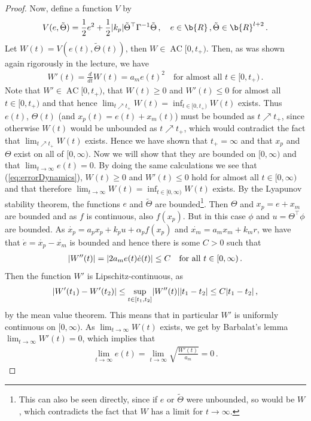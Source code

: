 \documentclass[12pt,a4paper]{article}
\DeclarePairedDelimiter{\abs}{\lvert}{\rvert}
\DeclareMathOperator{\AC}{AC}
\begin{document}
\begin{proof}
		Now, define a function $V$ by
		\begin{align*}
			V(e,\tilde{\Theta})
			= \frac{1}{2}e^2 + \frac{1}{2}\abs{k_p} \tilde{\Theta}^\top \Gamma^{-1} \tilde{\Theta}\,, \quad 
			e \in \b{R}\,, \tilde{\Theta} \in \b{R}^{l+2}\,.
		\end{align*}
		Let $W(t) = V(e(t),\tilde{\Theta}(t))$, then $W \in \AC[0,t_+)$.
		Then, as was shown again rigorously in the lecture, we have
		\begin{align*}
		    W'(t)
			= \frac{d}{dt} W(t)
			= a_m e(t)^2 \quad 
			\text{for almost all } t \in [0,t_+)\,.
		\end{align*}
		Note that $W' \in \AC[0,t_+)$, that $W(t) \geq 0$ and $W'(t) \leq 0$ for almost all $t \in [0,t_+)$ and that hence $\lim_{t \nearrow t_+} W(t) = \inf_{t \in [0,t_+)} W(t)$ exists.
		Thus $e(t)$, $\Theta(t)$ (and $x_p(t) = e(t)+x_m(t)$) must be bounded as $t \nearrow t_+$, since otherwise $W(t)$ would be unbounded as $t \nearrow t_+$, which would contradict the fact that $\lim_{t \nearrow t_+} W(t)$ exists. 
		Hence we have shown that $t_+ = \infty$ and that $x_p$ and $\Theta$ exist on all of $[0,\infty)$.
		Now we will show that they are bounded on $[0,\infty)$ and that $\lim_{t \to \infty} e(t) = 0$.
		By doing the same calculations we see that (\ref{eq:errorDynamics}), $W(t) \geq 0$ and $W'(t) \leq 0$ hold for almost all $t \in [0,\infty)$ and that therefore $\lim_{t \to \infty} W(t) = \inf_{t \in [0,\infty)} W(t)$ exists. 
		By the Lyapunov stability theorem, the functions $e$ and $\tilde{\Theta}$ are bounded\footnote{This can also be seen directly, since if $e$ or $\tilde{\Theta}$ were unbounded, so would be $W$, which contradicts the fact that $W$ has a limit for $t \to \infty$.}.
		Then $\Theta$ and $x_p = e+x_m$ are bounded and as $f$ is continuous, also $f(x_p)$.
		But in this case $\phi$ and $u = \Theta^\top \phi$ are bounded.
		As $\dot{x_p} = a_p x_p + k_p u + \alpha_p f(x_p)$ and $\dot{x_m} = a_m x_m + k_m r$, we have that $\dot{e} = \dot{x_p} - \dot{x_m}$ is bounded and hence there is some $C > 0$ such that  
		\begin{align*}
			\abs*{W''(t)} 
			= \abs{2 a_m e(t) \dot{e}(t)}
			\leq C \quad 
			\text{for all } t \in [0,\infty)\,.
		\end{align*} 
		Then the function $W'$ is Lipschitz-continuous, as
		\begin{align*}
			\abs{W'(t_1)-W'(t_2)} \leq \sup_{t \in [t_1,t_2]} \abs{W''(t)} \abs{t_1-t_2} \leq C\abs{t_1-t_2}\,,
		\end{align*}
		by the mean value theorem. 
		This means that in particular $W'$ is uniformly continuous on $[0,\infty)$.
		As $\lim_{t \to \infty} W(t)$ exists, we get by Barbalat's lemma $\lim_{t \to \infty} W'(t) = 0$, which implies that
		\begin{align*}
			\lim_{t \to \infty} e(t) = \lim_{t \to \infty} \sqrt{\frac{W'(t)}{a_m}} = 0\,.
		\end{align*}  
	\end{proof}
\end{document}
